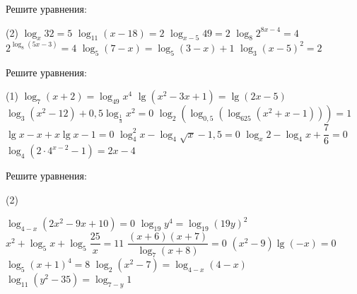 \begin{class}[number=3]
	\begin{listofex}
		\item Решите уравнения:
		\begin{tasks}(2)
			\task \( \log_x 32 =5 \)
			\task \( \log_{11} (x-18) = 2 \)
			\task \( \log_{x-5}49=2 \)
			\task \( \log_8 2^{8x-4}=4 \)
			\task \( 2^{\log_8 (5x-3)}=4 \)
			\task \( \log_5(7-x)=\log_5(3-x)+1 \)
			\task \( \log_3 (x-5)^2 = 2 \)
		\end{tasks}
		
		\item Решите уравнения: %
		\begin{tasks}(1)
			\task \( \log_7(x+2)=\log_{49}x^4 \)
			\task \( \lg (x^2-3x+1)= \lg (2x-5) \)
			\task \( \log_3 (x^2-12)+ 0,5 \log_{\tfrac{1}{3}} x^2 = 0 \)
			\task \( \log_2 (\log_{0,5} (\log_{625} (x^2+x-1) ) )=1 \)
			\task \( \lg x - x + x \lg x -1 =0 \)
			\task \( \log_4^2x - \log_4 \sqrt{x} - 1,5 = 0 \)
			\task \( \log_x 2 - \log_4 x + \dfrac{7}{6} = 0 \)
			\task \( \log_4 (2 \cdot 4^{x-2}-1)=2x-4 \)
		\end{tasks}
		
		
		
		
		
	\end{listofex}
\end{class}

\begin{class}[number=4]
	\begin{listofex}
		\item Решите уравнения: %
		\begin{tasks}(2)
			
			\task \( \log_{4-x} (2x^2-9x+10)=0 \)
			\task \( \log_{19} y^4 = \log_{19}(19y)^2 \)
			\task \( x^2+\log_5 x + \log_5 \dfrac{25}{x}=11 \)
			\task \( \dfrac{(x+6)(x+7)}{\log_7 (x+8)} = 0 \)
			\task \( (x^2-9)\lg(-x)=0 \)
			\task \( \log_5 (x+1)^4=8 \)
			\task \( \log_2 (x^2-7) = \log_{4-x}(4-x) \)
			\task \( \log_{11} (y^2-35)=\log_{7-y} 1 \)
		\end{tasks}
		
		
	\end{listofex}
\end{class}

